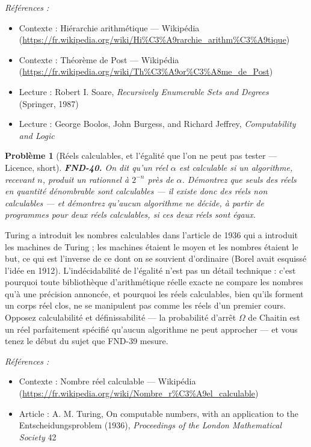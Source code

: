 \documentclass[11pt]{article}
\newtheorem{problem}{Problème}
\newenvironment{refs}{\par\small\noindent\emph{Références :}\begin{itemize}\setlength\itemsep{0pt}}{\end{itemize}\normalsize}
\begin{document}
\begin{refs}
\item Contexte : Hiérarchie arithmétique --- Wikipédia (\url{https://fr.wikipedia.org/wiki/Hi%C3%A9rarchie_arithm%C3%A9tique})
\item Contexte : Théorème de Post --- Wikipédia (\url{https://fr.wikipedia.org/wiki/Th%C3%A9or%C3%A8me_de_Post})
\item Lecture : Robert I. Soare, \textit{Recursively Enumerable Sets and Degrees} (Springer, 1987)
\item Lecture : George Boolos, John Burgess, and Richard Jeffrey, \textit{Computability and Logic}
\end{refs}

\bigskip

\begin{problem}[{Réels calculables, et l'égalité que l'on ne peut pas tester --- Licence, short}]
\textbf{FND-40.} On dit qu'un réel $ \alpha $ est \textit{calculable} si un
algorithme, recevant $ n $, produit un rationnel à $ 2^{-n} $ près de $ \alpha $. Démontrez
que seuls des réels en quantité dénombrable sont calculables --- il existe donc des réels non
calculables --- et démontrez qu'aucun algorithme ne décide, à partir de programmes pour deux réels
calculables, si ces deux réels sont égaux.
\end{problem}

\noindent Turing a introduit les nombres calculables dans l'article de 1936 qui a
introduit les machines de Turing ; les machines étaient le moyen et les nombres étaient le but, ce
qui est l'inverse de ce dont on se souvient d'ordinaire (Borel avait esquissé l'idée en 1912).
L'indécidabilité de l'égalité n'est pas un détail technique : c'est pourquoi toute bibliothèque
d'arithmétique réelle exacte ne compare les nombres qu'à une précision annoncée, et pourquoi les
réels calculables, bien qu'ils forment un corps réel clos, ne se manipulent pas comme les réels
d'un premier cours. Opposez calculabilité et définissabilité --- la probabilité d'arrêt $ \Omega $
de Chaitin est un réel parfaitement spécifié qu'aucun algorithme ne peut approcher --- et vous tenez
le début du sujet que FND-39 mesure.

\begin{refs}
\item Contexte : Nombre réel calculable --- Wikipédia (\url{https://fr.wikipedia.org/wiki/Nombre_r%C3%A9el_calculable})
\item Article : A. M. Turing, \og{} On computable numbers, with an application to the Entscheidungsproblem \fg{} (1936), \textit{Proceedings of the London Mathematical Society} 42
\end{refs}
\end{document}
